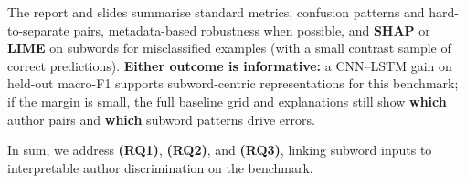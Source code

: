 \documentclass[11pt]{article}
\begin{document}
The report and slides summarise standard metrics, confusion patterns and hard-to-separate pairs, metadata-based robustness when possible, and \textbf{{SHAP}} or \textbf{{LIME}} on subwords for misclassified examples (with a small contrast sample of correct predictions). \textbf{Either outcome is informative:} a {CNN}--{LSTM} gain on held-out macro-{F1} supports subword-centric representations for this benchmark; if the margin is small, the full baseline grid and explanations still show \textbf{which} author pairs and \textbf{which} subword patterns drive errors.

In sum, we address \textbf{(RQ1)}, \textbf{(RQ2)}, and \textbf{(RQ3)}, linking subword inputs to interpretable author discrimination on the benchmark.


\end{document}
